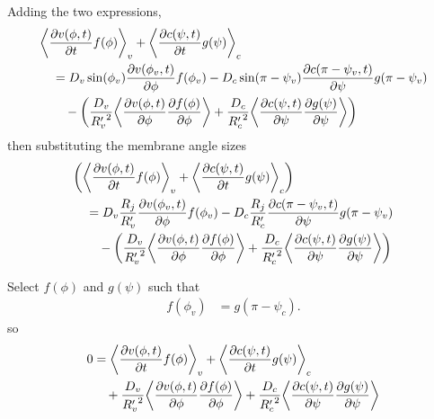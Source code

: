 \documentclass{report}
\newcommand\Par[1]{{ \left({#1}\right) }}
\newcommand\Angle[1]{{ \left\langle{#1}\right\rangle }}
\newcommand\Rc{{ R'_c }}
\newcommand\Rv{{ R'_v }}
\begin{document}
Adding the two expressions,
\begin{align*}
	& \Angle{\pdv{v(\phi, t)}{t} f(\phi)}_v + \Angle{\pdv{c(\psi, t)}{t} g(\psi)}_c \\
	& \quad= D_v \sin(\phi_v) \pdv{v(\phi_v, t)}{\phi} f(\phi_v) - D_c \sin(\pi - \psi_v) \pdv{c(\pi - \psi_v, t)}{\psi} g(\pi - \psi_v) \\
	& \qquad- \Par{\frac{D_v}{\Rv^2} \Angle{\pdv{v(\phi, t)}{\phi} \pdv{f(\phi)}{\phi}} + \frac{D_c}{\Rc^2} \Angle{\pdv{c(\psi, t)}{\psi} \pdv{g(\psi)}{\psi}}}
\end{align*}
then substituting the membrane angle sizes
\begin{align*}
	& \Par{\Angle{\pdv{v(\phi, t)}{t} f(\phi)}_v + \Angle{\pdv{c(\psi, t)}{t} g(\psi)}_c} \\
	& \quad= D_v \frac{R_j}{\Rv} \pdv{v(\phi_v, t)}{\phi} f(\phi_v) - D_c \frac{R_j}{\Rc} \pdv{c(\pi - \psi_v, t)}{\psi} g(\pi - \psi_v) \\
	& \qquad- \Par{\frac{D_v}{\Rv^2} \Angle{\pdv{v(\phi, t)}{\phi} \pdv{f(\phi)}{\phi}} + \frac{D_c}{\Rc^2} \Angle{\pdv{c(\psi, t)}{\psi} \pdv{g(\psi)}{\psi}}}
\end{align*}

Select $f(\phi)$ and $g(\psi)$ such that
\begin{align*}
	f(\phi_v) &= g(\pi - \psi_c).
\end{align*}
so
\begin{align*}
	0 &= \Angle{\pdv{v(\phi, t)}{t} f(\phi)}_v + \Angle{\pdv{c(\psi, t)}{t} g(\psi)}_c \\
	&\quad+ \frac{D_v}{\Rv^2} \Angle{\pdv{v(\phi, t)}{\phi} \pdv{f(\phi)}{\phi}} + \frac{D_c}{\Rc^2} \Angle{\pdv{c(\psi, t)}{\psi} \pdv{g(\psi)}{\psi}}
\end{align*}
\end{document}
